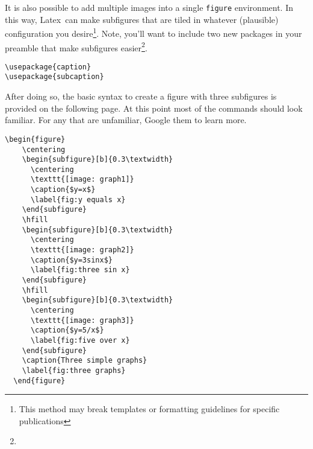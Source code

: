 \documentclass[10pt]{article}
\renewcommand{\LaTeX}{Latex}
\begin{document}
It is also possible to add multiple images into a single \lstinline{figure} environment. In this way, \LaTeX\ can make subfigures that are tiled in whatever (plausible) configuration you desire\footnote{This method may break templates or formatting guidelines for specific publications}. Note, you'll want to include two new packages in your preamble that make subfigures easier\footnote{}.
\begin{lstlisting}
\usepackage{caption}
\usepackage{subcaption}
\end{lstlisting}

After doing so, the basic syntax to create a figure with three subfigures is provided on the following page. At this point most of the commands should look familiar. For any that are unfamiliar, Google them to learn more.
\begin{lstlisting}[basicstyle=\ttfamily\footnotesize]
  \begin{figure}
    \centering
    \begin{subfigure}[b]{0.3\textwidth}
      \centering
      \texttt{[image: graph1]}
      \caption{$y=x$}
      \label{fig:y equals x}
    \end{subfigure}
    \hfill
    \begin{subfigure}[b]{0.3\textwidth}
      \centering
      \texttt{[image: graph2]}
      \caption{$y=3sinx$}
      \label{fig:three sin x}
    \end{subfigure}
    \hfill
    \begin{subfigure}[b]{0.3\textwidth}
      \centering
      \texttt{[image: graph3]}
      \caption{$y=5/x$}
      \label{fig:five over x}
    \end{subfigure}
    \caption{Three simple graphs}
    \label{fig:three graphs}
  \end{figure}
  \end{lstlisting}
\end{document}
